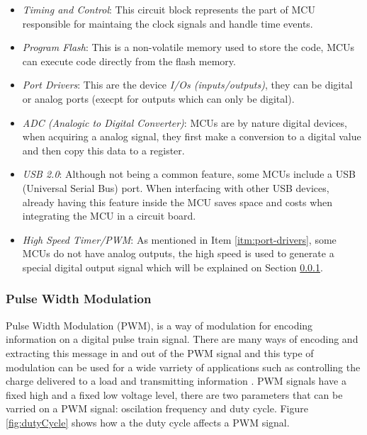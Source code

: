 		\begin{itemize}
			\item\textit{Timing and Control}: This circuit block represents the part of MCU responsible for maintaing the clock signals and handle time events.\label{itm:timing-and-control}
			\item\textit{Program Flash}: This is a non-volatile memory used to store the code, MCUs can execute code directly from the flash memory.\label{itm:program-flash}
			\item\textit{Port Drivers}: This are the device \textit{I/Os (inputs/outputs)}, they can be digital or analog ports (execpt for outputs which can only be digital).\label{itm:port-drivers}
			\item\textit{ADC (Analogic to Digital Converter)}: MCUs are by nature digital devices, when acquiring a analog signal, they first make a conversion to a digital value and then copy this data to a register.\label{itm:adc}
			\item\textit{USB 2.0}: Although not being a common feature, some MCUs include a USB (Universal Serial Bus) port. When interfacing with other USB devices, already having this feature inside the MCU saves space and costs when integrating the MCU in a circuit board.\label{itm:mcu-usb}
			\item\textit{High Speed Timer/PWM}: As mentioned in Item \ref{itm:port-drivers}, some MCUs do not have analog outputs, the high speed is used to generate a special digital output signal which will be explained on Section \ref{ssec:mcu-pwm}.\label{itm:high-speed-timer-pwm}
		\end{itemize}

	\subsubsection{Pulse Width Modulation} \label{ssec:mcu-pwm}
			Pulse Width Modulation (PWM), is a way of modulation for encoding information on a digital pulse train signal. There are many ways of encoding and extracting this message in and out of the PWM signal and this type of modulation can be used for a wide varriety of applications such as controlling the charge delivered to a load and transmitting information \cite{standard19961037c}. PWM signals have a fixed high and a fixed low voltage level, there are two parameters that can be varried on a PWM signal: oscilation frequency and duty cycle. Figure \ref{fig:dutyCycle} shows how a the duty cycle affects a PWM signal. 

